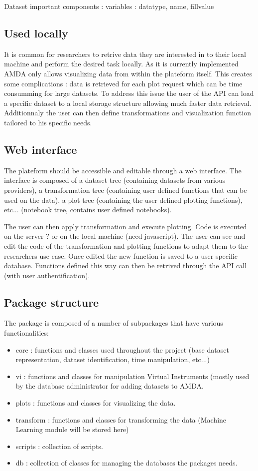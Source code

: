 \documentclass[a4paper,11pt]{report}
\begin{document}
Dataset important components : 
  variables : datatype, name, fillvalue

\subsection{Used locally}
It is common for researchers to retrive data they are interested in to their local machine and
perform the desired task locally. As it is currently implemented AMDA only allows visualizing 
data from within the plateform itself. This creates some complications : data is retrieved for 
each plot request which can be time consumming for large datasets. To address this issue the user
of the API can load a specific dataset to a local storage structure allowing much faster data 
retrieval. Additionnaly the user can then define transformations and visualization function tailored
to his specific needs. 

\subsection{Web interface}
The plateform should be accessible and editable through a web interface. The interface is composed
of a dataset tree (containing datasets from various providers), a transformation tree (containing user
defined functions that can be used on the data), a plot tree (containing the user defined plotting 
functions), etc... (notebook tree, contains user defined notebooks).

The user can then apply transformation and execute plotting. Code is executed on the server ? or on the
local machine (need javascript). The user can see and edit the code of the transformation and plotting functions to adapt them to the researchers use case. Once edited the new function is saved to a user 
specific database. Functions defined this way can then be retrived through the API call (with user 
authentification).




\subsection{Package structure}
The package is composed of a number of subpackages that have various functionalities:
\begin{itemize}
\item core : functions and classes used throughout the project (base dataset representation, dataset
identification, time manipulation, etc...)
\item vi : functions and classes for manipulation Virtual Instruments (mostly used by the database administrator for adding datasets to AMDA.
\item plots : functions and classes for visualizing the data.
\item transform : functions and classes for transforming the data (Machine Learning module will be stored here)
\item scripts : collection of scripts.
\item db : collection of classes for managing the databases the packages needs.
\end{itemize}
\end{document}
